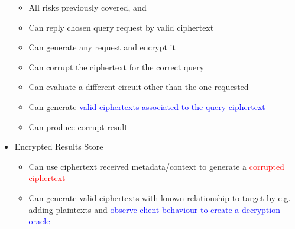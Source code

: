 \begin{itemize}
          \begin{itemize}
              \item All risks previously covered, and
              \item Can reply chosen query request by valid ciphertext
              \item Can generate any request and encrypt it
              \item Can corrupt the ciphertext for the correct query
              \item Can evaluate a different circuit other than the one requested
              \item Can generate \textcolor{blue}{valid ciphertexts associated to the query ciphertext}
              \item Can produce corrupt result
          \end{itemize}
    \item Encrypted Results Store
          \begin{itemize}
              \item Can use ciphertext received metadata/context to generate a \textcolor{red}{corrupted ciphertext}
              \item Can generate valid ciphertexts with known relationship to target by e.g. adding plaintexts and \textcolor{blue}{observe client behaviour to create a decryption oracle}
          \end{itemize}
\end{itemize}

